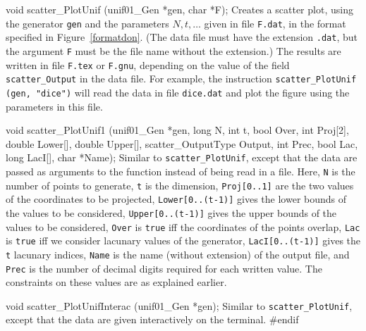 \fi  %



\code

void scatter_PlotUnif (unif01_Gen *gen, char *F);
\endcode
  \tab Creates a scatter plot, using the generator
  {\tt gen} and the parameters $N, t, \ldots$ given in file
  {\tt F.dat}, in the format specified in Figure~\ref{formatdon}.
  (The data file must have the extension {\tt .dat}, but
  the argument {\tt F} must be the file name without the extension.)
  The results are written in file {\tt F.tex} or {\tt F.gnu},
  depending on the value of the field {\tt scatter\_Output} in the
  data file.
  For example, the instruction {\tt scatter\_PlotUnif (gen, "dice")}
  will read the data in file {\tt dice.dat} and plot the figure using the
  parameters in this file.
 \endtab
\code


void scatter_PlotUnif1 (unif01_Gen *gen, long N, int t, bool Over,
   int Proj[2], double Lower[], double Upper[], scatter_OutputType Output,
   int Prec, bool Lac, long LacI[], char *Name);
\endcode
  \tab
  Similar to  {\tt scatter\_PlotUnif}, except that the data are
  passed as arguments to the function instead of being read in a file.
  Here, {\tt N} is the number of points to generate,
  {\tt t} is the dimension,
  {\tt Proj[0..1]} are the two values of the coordinates to be projected,
  {\tt Lower[0..(t-1)]} gives the lower bounds of the values to be considered,
  {\tt Upper[0..(t-1)]} gives the upper bounds of the values to be considered,
  {\tt Over} is  {\tt true} iff the coordinates of the  points overlap,
  {\tt Lac} is  {\tt true} iff we consider lacunary values of the generator,
  {\tt LacI[0..(t-1)]} gives the {\tt t} lacunary indices,
  {\tt Name} is the name (without extension) of the output file, and
  {\tt Prec} is the number of decimal digits required for each written value.
  The constraints on these values are as explained earlier.
 \endtab
\code


void scatter_PlotUnifInterac (unif01_Gen *gen);
\endcode
  \tab Similar to {\tt scatter\_PlotUnif}, except that the data are
   given interactively on the terminal.
 \endtab
\code
\hide
#endif
\endhide
\endcode
